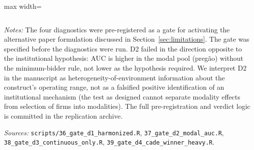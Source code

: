 \begin{table}[htbp]
\begin{adjustbox}{max width=\textwidth}
\begin{threeparttable}
\begin{tabular}{p{3.5cm}p{6.5cm}p{4cm}c}
\bottomrule
\end{tabular}
\begin{tablenotes}
\small
\item \textit{Notes:} The four diagnostics were pre-registered as a gate
for activating the alternative paper formulation discussed in
Section~\ref{sec:limitations}. The gate was specified before the
diagnostics were run. D2 failed in the direction opposite to the
institutional hypothesis: AUC is higher in the modal pool
(preg\~ao) without the minimum-bidder rule, not lower as the
hypothesis required. We interpret D2 in the manuscript as
heterogeneity-of-environment information about the construct's
operating range, not as a falsified positive identification of an
institutional mechanism (the test as designed cannot separate
modality effects from selection of firms into modalities). The full
pre-registration and verdict logic is committed in the replication
archive.
\item \textit{Sources:} \texttt{scripts/36\_gate\_d1\_harmonized.R},
\texttt{37\_gate\_d2\_modal\_auc.R},
\texttt{38\_gate\_d3\_continuous\_only.R},
\texttt{39\_gate\_d4\_cade\_winner\_heavy.R}.
\end{tablenotes}
\end{threeparttable}
\end{adjustbox}
\end{table}
